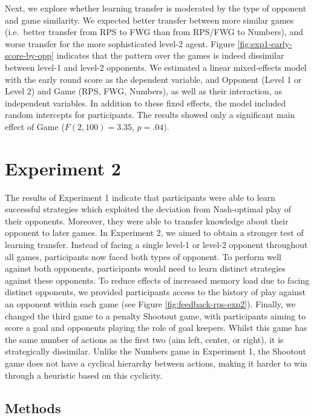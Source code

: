 \documentclass[smallextended]{svjour3}       %
\begin{document}
Next, we explore whether learning transfer is moderated by the type of
opponent and game similarity. We expected better transfer between more
similar games (i.e.~better transfer from RPS to FWG than from RPS/FWG to
Numbers), and worse transfer for the more sophisticated level-2 agent.
Figure \ref{fig:exp1-early-score-by-opp} indicates that the pattern over
the games is indeed dissimilar between level-1 and level-2 opponents. We
estimated a linear mixed-effects model with the early round score as the
dependent variable, and Opponent (Level 1 or Level 2) and Game (RPS,
FWG, Numbers), as well as their interaction, as independent variables.
In addition to these fixed effects, the model included random intercepts
for participants. The results showed only a significant main effect of
Game (\(F(2,100) = 3.35\), \(p = .04\)).

\hypertarget{experiment-2}{%
\section{Experiment 2}\label{experiment-2}}

The results of Experiment 1 indicate that participants were able to
learn successful strategies which exploited the deviation from
Nash-optimal play of their opponents. Moreover, they were able to
transfer knowledge about their opponent to later games. In Experiment 2,
we aimed to obtain a stronger test of learning transfer. Instead of
facing a single level-1 or level-2 opponent throughout all games,
participants now faced both types of opponent. To perform well against
both opponents, participants would need to learn distinct strategies
against these opponents. To reduce effects of increased memory load due
to facing distinct opponents, we provided participants access to the
history of play against an opponent within each game (see Figure
\ref{fig:feedback-rps-exp2}). Finally, we changed the third game to a
penalty Shootout game, with participants aiming to score a goal and
opponents playing the role of goal keepers. Whilst this game has the
same number of actions as the first two (aim left, center, or right), it
is strategically dissimilar. Unlike the Numbers game in Experiment 1,
the Shootout game does not have a cyclical hierarchy between actions,
making it harder to win through a heuristic based on this cyclicity.

\hypertarget{methods-1}{%
\subsection{Methods}\label{methods-1}}
\end{document}
